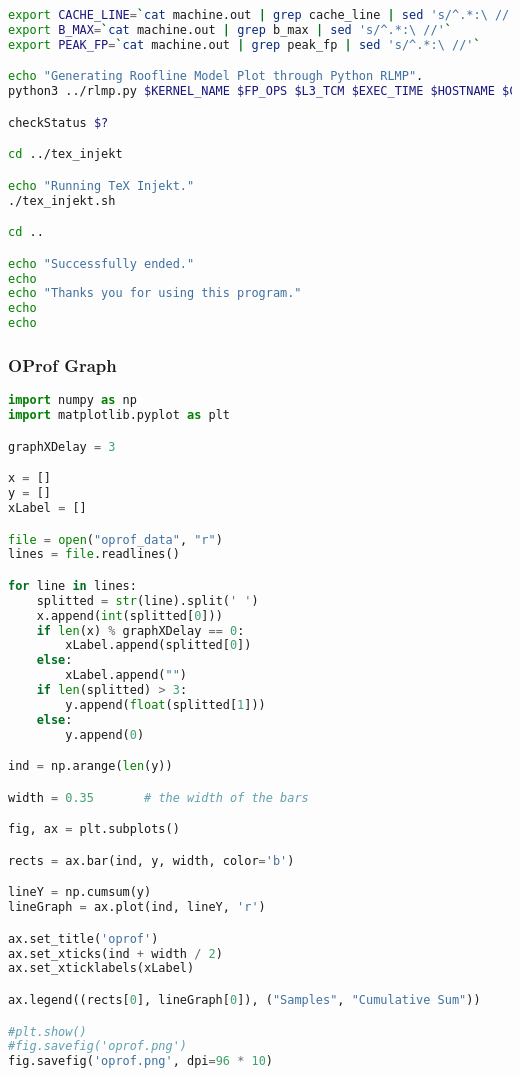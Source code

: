 \begin{lstlisting}[language=bash,breaklines=true]
export CACHE_LINE=`cat machine.out | grep cache_line | sed 's/^.*:\ //'`
export B_MAX=`cat machine.out | grep b_max | sed 's/^.*:\ //'`
export PEAK_FP=`cat machine.out | grep peak_fp | sed 's/^.*:\ //'`

echo "Generating Roofline Model Plot through Python RLMP".
python3 ../rlmp.py $KERNEL_NAME $FP_OPS $L3_TCM $EXEC_TIME $HOSTNAME $CACHE_LINE $B_MAX $PEAK_FP $FP_OPS_OPT $L3_TCM_OPT $EXEC_TIME_OPT > rlm.out

checkStatus $?

cd ../tex_injekt

echo "Running TeX Injekt."
./tex_injekt.sh

cd ..

echo "Successfully ended."
echo
echo "Thanks you for using this program."
echo
echo

\end{lstlisting}

\subsubsection{OProf Graph}
\begin{lstlisting}[language=python,breaklines=true]
import numpy as np
import matplotlib.pyplot as plt

graphXDelay = 3

x = []
y = []
xLabel = []

file = open("oprof_data", "r") 
lines = file.readlines()

for line in lines:
	splitted = str(line).split(' ')
	x.append(int(splitted[0]))
	if len(x) % graphXDelay == 0:
		xLabel.append(splitted[0])
	else:
		xLabel.append("")
	if len(splitted) > 3:
		y.append(float(splitted[1]))
	else:
		y.append(0)

ind = np.arange(len(y))

width = 0.35       # the width of the bars

fig, ax = plt.subplots()

rects = ax.bar(ind, y, width, color='b')

lineY = np.cumsum(y)
lineGraph = ax.plot(ind, lineY, 'r')

ax.set_title('oprof')
ax.set_xticks(ind + width / 2)
ax.set_xticklabels(xLabel)

ax.legend((rects[0], lineGraph[0]), ("Samples", "Cumulative Sum"))

#plt.show()
#fig.savefig('oprof.png')
fig.savefig('oprof.png', dpi=96 * 10)




\end{lstlisting}

